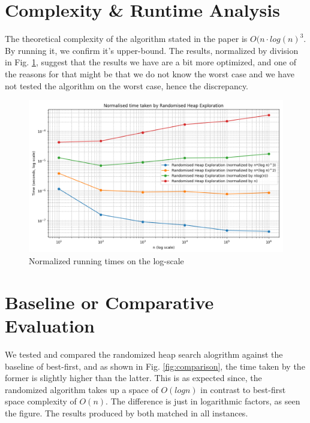 \documentclass{article}
\begin{document}
\section{Complexity \& Runtime Analysis}
The theoretical complexity of the algorithm stated in the paper is $O(n\cdot log(n)^3$. By running it, we confirm it's upper-bound. The results, normalized by division in Fig. \ref{fig:normailsed-run-time}, suggest that the results we have are a bit more optimized, and one of the reasons for that might be that we do not know the worst case and we have not tested the algorithm on the worst case, hence the discrepancy.
\begin{figure}
    \centering
    \includegraphics[width=1\linewidth]{images/normalised_performance_comparison.png}
    \caption{Normalized running times on the log-scale}
    \label{fig:normailsed-run-time}
\end{figure}
\section{Baseline or Comparative Evaluation}
We tested and compared the randomized heap search alogrithm against the baseline of best-first, and as shown in Fig. \ref{fig:comparison}, the time taken by the former is slightly higher than the latter. This is as expected since, the randomized algorithm takes up a space of $O(logn)$ in contrast to best-first space complexity of $O(n)$. The difference is just in logarithmic factors, as seen the figure. The results produced by both matched in all instances.
\end{document}
